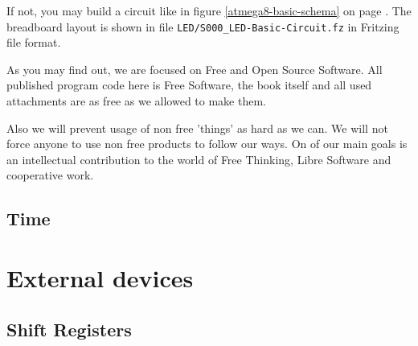 \documentclass[twoside,english,12pt,authoryear,openright]{book}
\begin{document}
If not, you may build a circuit like in figure \ref{atmega8-basic-schema} on page \pageref{atmega8-basic-schema}. The breadboard layout is shown in file \texttt{LED/S000\_LED-Basic-Circuit.fz} in Fritzing file format.

As you may find out, we are focused on Free and Open Source Software. All published program code here is Free Software, the book itself and all used attachments are as free as we allowed to make them.

Also we will prevent usage of non free 'things' as hard as we can. We will not force anyone to use non free products to follow our ways. On of our main goals is an intellectual contribution to the world of Free Thinking, Libre Software and cooperative work.









\chapter{Time}




\part{External devices}

\chapter{Shift Registers}


\end{document}
